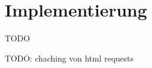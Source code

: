 \section{Implementierung}
\label{sec:implementation-analysis}

TODO

TODO: chaching von html requests

